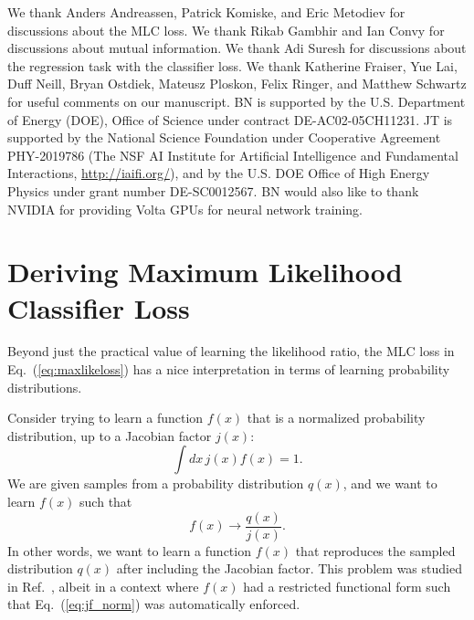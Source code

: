 \documentclass[aps,prx,reprint,preprintnumbers,superscriptaddress,nofootinbib,longbibliography,floatfix]{revtex4-2}
\DeclareRobustCommand{\Eq}[1]{Eq.~(\ref{eq:#1})}
\DeclareRobustCommand{\Ref}[1]{Ref.~\cite{#1}}
\begin{document}
\begin{acknowledgments}


We thank Anders Andreassen, Patrick Komiske, and Eric Metodiev for discussions about the MLC loss.
%
We thank Rikab Gambhir and Ian Convy for discussions about mutual information.
%
We thank Adi Suresh for discussions about the regression task with the classifier loss.
%
We thank Katherine Fraiser, Yue Lai, Duff Neill, Bryan Ostdiek, Mateusz Ploskon, Felix Ringer, and  Matthew Schwartz for useful comments on our manuscript.
%
BN is supported by the U.S. Department of Energy (DOE), Office of Science under contract DE-AC02-05CH11231.
%
JT is supported by the National Science Foundation under Cooperative Agreement PHY-2019786 (The NSF AI Institute for Artificial Intelligence and Fundamental Interactions, \url{http://iaifi.org/}), and by the U.S. DOE Office of High Energy Physics under grant number DE-SC0012567.
%
BN would also like to thank NVIDIA for providing Volta GPUs for neural network training.



\end{acknowledgments}

\appendix


\section{Deriving Maximum Likelihood Classifier Loss}
\label{app:maxlikeloss}

Beyond just the practical value of learning the likelihood ratio, the MLC loss in \Eq{maxlikeloss} has a nice interpretation in terms of learning probability distributions.


Consider trying to learn a function $f(x)$ that is a normalized probability distribution, up to a Jacobian factor $j(x)$:
%
\begin{equation}
\label{eq:jf_norm}
    \int dx \, j(x) f(x) = 1.
\end{equation}
%
We are given samples from a probability distribution $q(x)$, and we want to learn $f(x)$ such that
%
\begin{equation}
f(x) \to \frac{q(x)}{j(x)}.
\end{equation}
%
In other words, we want to learn a function $f(x)$ that reproduces the sampled distribution $q(x)$ after including the Jacobian factor.
%
This problem was studied in \Ref{Andreassen:2018apy}, albeit in a context where $f(x)$ had a restricted functional form such that \Eq{jf_norm} was automatically enforced.
\end{document}
